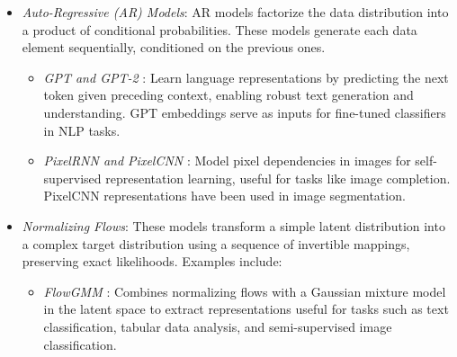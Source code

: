 \begin{itemize}
    \item \emph{Auto-Regressive (AR) Models}: AR models factorize the data distribution into a product of conditional probabilities. These models generate each data element sequentially, conditioned on the previous ones.
    \begin{itemize}
        \item \emph{GPT and GPT-2} \citep{radford2019language}: Learn language representations by predicting the next token given preceding context, enabling robust text generation and understanding. GPT embeddings serve as inputs for fine-tuned classifiers in NLP tasks.
        \item \emph{PixelRNN and PixelCNN} \citep{oord2016pixel}: Model pixel dependencies in images for self-supervised representation learning, useful for tasks like image completion. PixelCNN representations have been used in image segmentation.
    \end{itemize}

    \item \emph{Normalizing Flows}: These models transform a simple latent distribution into a complex target distribution using a sequence of invertible mappings, preserving exact likelihoods. Examples include:
\begin{itemize}
    \item \emph{FlowGMM} \citep{izmailov2021flowgmm}: Combines normalizing flows with a Gaussian mixture model in the latent space to extract representations useful for tasks such as text classification, tabular data analysis, and semi-supervised image classification.
\end{itemize}


\end{itemize}
